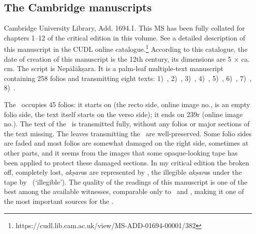 

\medskip
\subsection{The Cambridge manuscripts}

Cambridge University Library, Add. 1694.1. This MS has been 
fully collated for chapters 1--12 of the critical edition in this volume. 
See a detailed description of this manuscript in the 
CUDL online catalogue.\footnote{https://cudl.lib.cam.ac.uk/view/MS-ADD-01694-00001/382}
According to this catalogue, the date of creation of this manuscript 
is the 12th century, its dimensions are 5 × ca. cm. 
The script is Nepālākṣara. It is a palm-leaf multiple-text manuscript containing 258
folios and transmitting eight texts: 
1)~\SDhS,
2)~\SDhU,
3)~\SDhSangr,
4)~\Ums,
5)~\Uums, 
6)~\Vss,
7)~\DharmP,
8)~\SivaUp.

The \VSS\ occupies 45 folios: it starts on  
(the recto side, online image no., is an empty folio side,
the text itself starts on the verso side); 
it ends on \fol239r (online image no.). 
The text of the \VSS\ is transmitted fully,
without any folios or major sections of the text missing. The leaves
transmitting the \VSS\ are well-preserved. Some folio sides are faded and
most folios are somewhat damaged on the right side, sometimes at other parts, and it seems from the images that some opaque-looking tape has been applied to protect these damaged sections. 
In my critical edition
the broken off, completely lost, \emph{akṣara}s are represented by \lost,
the illegible \emph{akṣara}s under the tape by \il\ (`illegible'). The
quality of the readings of this manuscript is one of the best among
the available witnesses, comparable only to \msNa\ and \msP, 
making it one of the most important sources for the \VSS.


